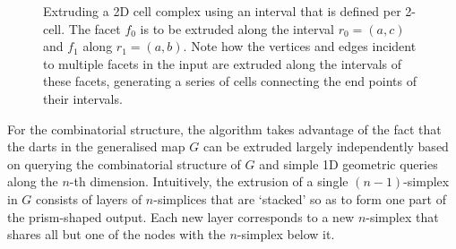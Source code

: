 \begin{figure}[tb]
\centering
{}
\quad
{}
\caption[Extruding a 2D cell complex]{Extruding a 2D cell complex using an interval that is defined per 2-cell.
The facet $f_0$ is to be extruded along the interval $r_0 = (a,c)$ and $f_1$ along $r_1 = (a,b)$.
Note how the vertices and edges incident to multiple facets in the input are extruded along the intervals of these facets, generating a series of cells connecting the end points of their intervals.}
\label{fig:blockscomplex}
\end{figure}

For the combinatorial structure, the algorithm takes advantage of the fact that the darts in the generalised map $G$ can be extruded largely independently based on querying the combinatorial structure of $G$ and simple 1D geometric queries along the $n$-th dimension.
Intuitively, the extrusion of a single $(n-1)$-simplex in $G$ consists of layers of $n$-simplices that are `stacked'
so as to form one part of the prism-shaped output.
Each new layer corresponds to a new $n$-simplex that shares all but one of the nodes with the $n$-simplex below it.

